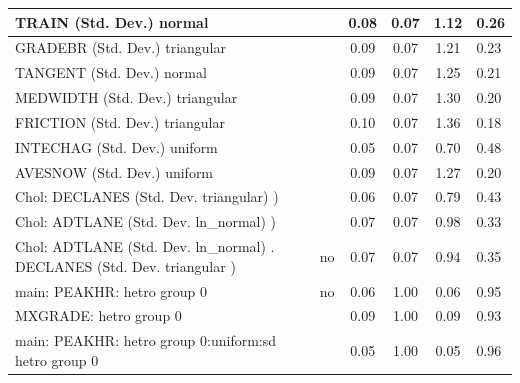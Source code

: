 \begin{table}
\begin{center}
\begin{tabular}{|l|l|c|c|c|l|}
			\hline
			TRAIN (Std. Dev.) normal &  & 0.08 & 0.07 & 1.12 & 0.26 \\
			\hline
			GRADEBR (Std. Dev.) triangular &  & 0.09 & 0.07 & 1.21 & 0.23 \\
			\hline
			TANGENT (Std. Dev.) normal &  & 0.09 & 0.07 & 1.25 & 0.21 \\
			\hline
			MEDWIDTH (Std. Dev.) triangular &  & 0.09 & 0.07 & 1.30 & 0.20 \\
			\hline
			FRICTION (Std. Dev.) triangular &  & 0.10 & 0.07 & 1.36 & 0.18 \\
			\hline
			INTECHAG (Std. Dev.) uniform &  & 0.05 & 0.07 & 0.70 & 0.48 \\
			\hline
			AVESNOW (Std. Dev.) uniform &  & 0.09 & 0.07 & 1.27 & 0.20 \\
			\hline
			 Chol: DECLANES (Std. Dev. triangular) ) &  & 0.06 & 0.07 & 0.79 & 0.43 \\
			\hline
			 Chol: ADTLANE (Std. Dev. ln_normal) ) &  & 0.07 & 0.07 & 0.98 & 0.33 \\
			\hline
			 Chol: ADTLANE (Std. Dev. ln_normal) . DECLANES (Std. Dev.   triangular ) & no & 0.07 & 0.07 & 0.94 & 0.35 \\
			\hline
			main: PEAKHR: hetro group 0 & no & 0.06 & 1.00 & 0.06 & 0.95 \\
			\hline
			MXGRADE: hetro group 0 &  & 0.09 & 1.00 & 0.09 & 0.93 \\
			\hline
			main: PEAKHR: hetro group 0:uniform:sd  hetro group 0 &  & 0.05 & 1.00 & 0.05 & 0.96 \\
			\hline
		\end{tabular}
	\end{center}
\end{table}
